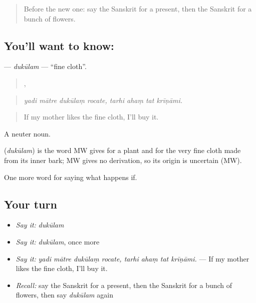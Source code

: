 \label{lesson:SA-C532-dukulam}



\begin{quote}
Before the new one: say the Sanskrit for a present, then the Sanskrit for a bunch of flowers.
\end{quote}

\subsection*{You'll want to know: }
\textbf{} — \emph{dukūlam} — \textquotedblleft{}fine cloth\textquotedblright{}.

\begin{quote}
   ,    
\end{quote}

\begin{quote}
\emph{yadi mātre dukūlaṃ rocate, tarhi ahaṃ tat krīṇāmi.}
\end{quote}

\begin{quote}
If my mother likes the fine cloth, I'll buy it.
\end{quote}

A neuter noun.

\begin{cousinweb}
\textbf{} (\emph{dukūlam}) is the word MW gives for a plant and for the very fine cloth made from its inner bark; MW gives no derivation, so its origin is uncertain (MW).
\end{cousinweb}

\begin{grammarlens}[title={What you've built}]
One more word for saying what happens if.
\end{grammarlens}

\subsection*{Your turn}
\begin{itemize}
\raggedright
  \item \emph{Say it:} \emph{dukūlam}
  \item \emph{Say it:} \emph{dukūlam}, once more
  \item \emph{Say it:} \emph{yadi mātre dukūlaṃ rocate, tarhi ahaṃ tat krīṇāmi.} — If my mother likes the fine cloth, I'll buy it.
  \item \emph{Recall:} say the Sanskrit for a present, then the Sanskrit for a bunch of flowers, then say \emph{dukūlam} again
\end{itemize}

